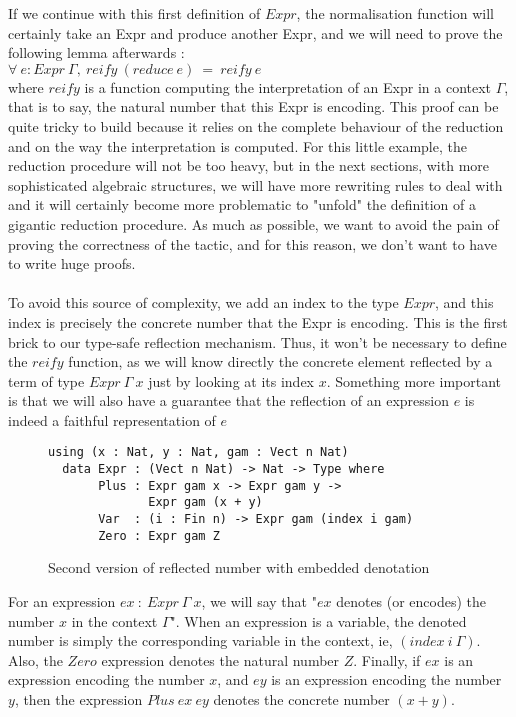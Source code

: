 If we continue with this first definition of $Expr$, the normalisation function will certainly take an Expr and produce another Expr, and we will need to prove the following lemma afterwards : \\
$\forall\ e:Expr\ \Gamma,\ reify\ (reduce\ e)\ =\ reify\ e$ \\
where $reify$ is a function computing the interpretation of an Expr in a context $\Gamma$, that is to say, the natural number that this Expr is encoding.
This proof can be quite tricky to build because it relies on the complete behaviour of the reduction and on the way the interpretation is computed.
For this little example, the reduction procedure will not be too heavy, but in the next sections, with more sophisticated algebraic structures, we will have more rewriting rules to deal with and it will certainly become more problematic to "unfold" the definition of a gigantic reduction procedure. As much as possible, we want to avoid the pain of proving the correctness of the tactic, and for this reason, we don't want to have to write huge proofs. \\
\\
To avoid this source of complexity, we add an index to the type $Expr$, and this index is precisely the concrete number that the Expr is encoding. This is the first brick to our type-safe reflection mechanism. Thus, it won't be necessary to define the $reify$ function, as we will know directly the concrete element reflected by a term of type $Expr\ \Gamma\ x$ just by looking at its index $x$. Something more important is that we will also have a guarantee that the reflection of an expression $e$ is indeed a faithful representation of $e$ \\

\begin{figure}[H]
\figrule
\begin{center}
\begin{verbatim}
using (x : Nat, y : Nat, gam : Vect n Nat)
  data Expr : (Vect n Nat) -> Nat -> Type where
       Plus : Expr gam x -> Expr gam y -> 
              Expr gam (x + y)
       Var  : (i : Fin n) -> Expr gam (index i gam)
       Zero : Expr gam Z
\end{verbatim}
\end{center}
\caption{Second version of reflected number with embedded denotation}
\figrule
\end{figure}

For an expression $ex\ :\ Expr\ \Gamma\ x$, we will say that "$ex$ denotes (or encodes) the number $x$ in the context $\Gamma$".
When an expression is a variable, the denoted number is simply the corresponding variable in the context, ie, $(index\ i\ \Gamma)$.
Also, the $Zero$ expression denotes the natural number $Z$.
Finally, if $ex$ is an expression encoding the number $x$, and $ey$ is an expression encoding the number $y$, then the expression $Plus\ ex\ ey$ denotes the concrete number $(x + y)$.


